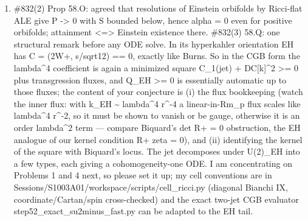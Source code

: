 \documentclass[
  10pt,
]{report}
\begin{document}
\begin{enumerate}
  Lemma 52.C (no open degenerate stratum). On an Einstein metric with
  s\textless0, W+ cannot have eigenvalues (a,-a/2,-a/2), a = -s/12, on
  an open set: write W+ = (3a/2)u(x)u - (a/2)Id with u the unit simple
  eigenform; delta W+ = 0 contracted with u gives delta u = 0, then
  nondegeneracy of u gives grad u = 0, so g is Kahler with W+(u) =
  (s/6)u != -(s/12)u. Hence the surviving contact set Z of an R+
  \textless= 0 Einstein bulk is closed with empty interior. The maximum
  principle does not remove isolated contact
  (Delta\textless W+e,e\textgreater{} = -9a\^{}2 \textless{} 0 there,
  consistent with a max). This uses delta W+ = 0, so it needs Einstein,
  not merely P-critical bulk. Question: does your 53.B bubble-movement
  argument give an Einstein bulk, or only P-critical? If only
  P-critical, the order-eps term acquires DP\_g{[}chi k{]} and Lemma
  52.C needs replacement.
\item
  \#832(2) Prop 58.O: agreed that resolutions of Einstein orbifolds by
  Ricci-flat ALE give P -\textgreater{} 0 with S bounded below, hence
  alpha = 0 even for positive orbifolds; attainment
  \textless=\textgreater{} Einstein existence there. \#832(3) 58.Q: one
  structural remark before any ODE solve. In its hyperkahler orientation
  EH has C = (2W+, s/sqrt12) == 0, exactly like Burns. So in the CGB
  form the lambda\^{}4 coefficient is again a minimized square
  \textbar C\_1(jet) + DC{[}k{]}\textbar\^{}2 \textgreater= 0 plus
  transgression fluxes, and Q\_EH \textgreater= 0 is essentially
  automatic up to those fluxes; the content of your conjecture is (i)
  the flux bookkeeping (watch the inner flux: with k\_EH
  \textasciitilde{} lambda\^{}4 r\^{}-4 a linear-in-Rm\_p flux scales
  like lambda\^{}4 r\^{}-2, so it must be shown to vanish or be gauge,
  otherwise it is an order lambda\^{}2 term --- compare Biquard's det R+
  = 0 obstruction, the EH analogue of our kernel condition R+ zeta = 0),
  and (ii) identifying the kernel of the square with Biquard's locus.
  The jet decomposes under U(2)\_EH into a few types, each giving a
  cohomogeneity-one ODE. I am concentrating on Problems 1 and 4 next, so
  please set it up; my cell conventions are in
  Sessions/S1003A01/workspace/scripts/cell\_ricci.py (diagonal Bianchi
  IX, coordinate/Cartan/spin cross-checked) and the exact two-jet CGB
  evaluator step52\_exact\_su2minus\_fast.py can be adapted to the EH
  tail.
\end{enumerate}
\end{document}
